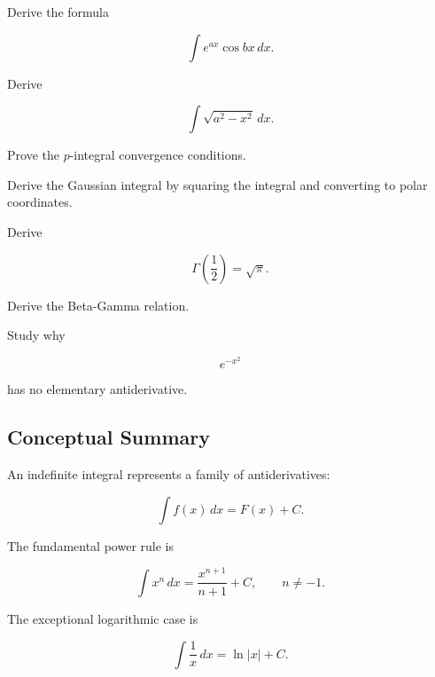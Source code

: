 \begin{exercise}[4]
Derive the formula

\[
\int
e^{ax}\cos bx
\,dx.
\]
\end{exercise}

\begin{exercise}[4]
Derive

\[
\int
\sqrt{a^2-x^2}
\,dx.
\]
\end{exercise}

\begin{exercise}[4]
Prove the \(p\)-integral convergence conditions.
\end{exercise}

\begin{exercise}[4]
Derive the Gaussian integral by squaring the integral and converting to polar
coordinates.
\end{exercise}

\begin{exercise}[4]
Derive

\[
\Gamma
\left(
\frac12
\right)
=
\sqrt{\pi}.
\]
\end{exercise}

\begin{exercise}[4]
Derive the Beta-Gamma relation.
\end{exercise}

\begin{exercise}[4]
Study why

\[
e^{-x^2}
\]

has no elementary antiderivative.
\end{exercise}

\subsection{Conceptual Summary}
\label{subsec:integral-tables-summary}

An indefinite integral represents a family of antiderivatives:

\[
\boxed{
\int f(x)\,dx
=
F(x)+C.
}
\]

The fundamental power rule is

\[
\boxed{
\int x^n\,dx
=
\frac{
x^{n+1}
}{
n+1
}
+
C,
\qquad
n\neq-1.
}
\]

The exceptional logarithmic case is

\[
\boxed{
\int\frac1x\,dx
=
\ln|x|+C.
}
\]

